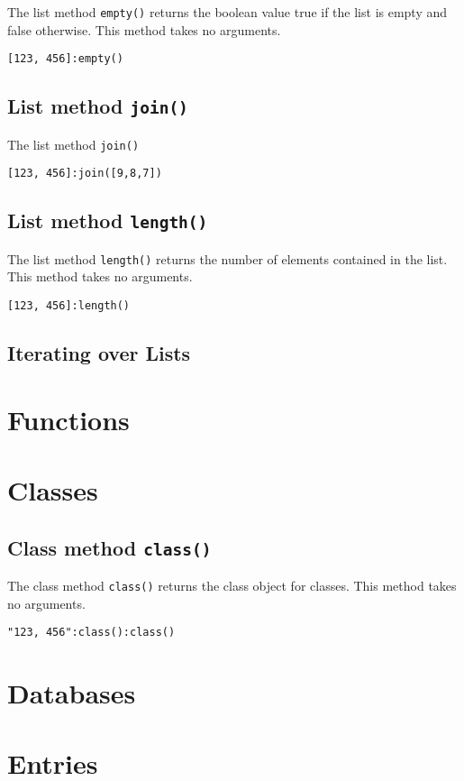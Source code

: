 \documentclass[11pt,a4paper]{scrbook}
\begin{document}
The list method \texttt{empty()} returns the boolean value true if the list is
empty and false otherwise. This method takes no arguments.

\begin{lstlisting}[language=BibTool]
[123, 456]:empty()
\end{lstlisting}

\subsection{List method \texttt{join()}}

The list method \texttt{join()}

\begin{lstlisting}[language=BibTool]
[123, 456]:join([9,8,7])
\end{lstlisting}

\subsection{List method \texttt{length()}}

The list method \texttt{length()} returns the number of elements contained in
the list. This method takes no arguments.

\begin{lstlisting}[language=BibTool]
[123, 456]:length()
\end{lstlisting}

\subsection{Iterating over Lists}


\section{Functions}



\section{Classes}\label{sec:classes}



\subsection{Class method \texttt{class()}}

The class method \texttt{class()} returns the class object for classes. This
method takes no arguments.

\begin{lstlisting}[language=BibTool]
"123, 456":class():class()
\end{lstlisting}


\section{Databases}



\section{Entries}

\end{document}

